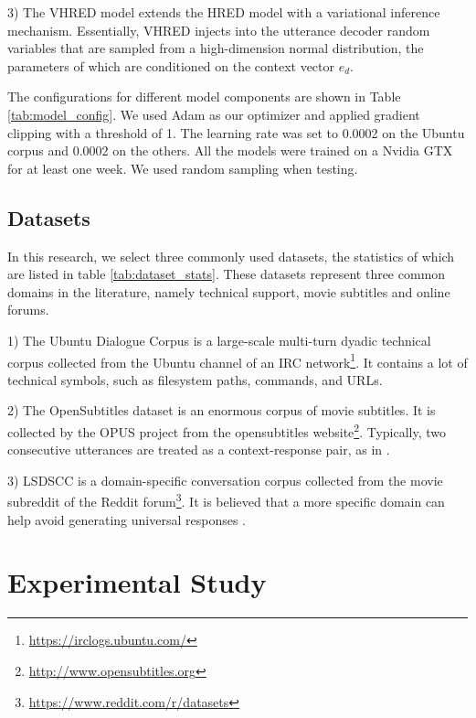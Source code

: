 \documentclass[runningheads]{llncs}
\begin{document}
3) The VHRED model \cite{VHRED} extends the HRED model with a variational inference mechanism. Essentially, VHRED injects into the utterance decoder random variables that are sampled from a high-dimension normal distribution, the parameters of which are conditioned on the context vector $e_d$. 

    The configurations for different model components are shown in Table \ref{tab:model_config}. We used Adam \cite{AdamOpt} as our optimizer and applied gradient clipping with a threshold of 1. The learning rate was set to 0.0002 on the Ubuntu corpus and 0.0002 on the others. All the models were trained on a Nvidia GTX for at least one week. We used random sampling when testing.
    

\subsection{Datasets}
In this research, we select three commonly used datasets, the statistics of which are listed in table \ref{tab:dataset_stats}. These datasets represent three common domains in the literature, namely technical support, movie subtitles and online forums.
    

1) The Ubuntu Dialogue Corpus \cite{ubuntu_corpus} is a large-scale multi-turn dyadic technical corpus collected from the Ubuntu channel of an IRC network\footnote{\url{https://irclogs.ubuntu.com/}}. It contains a lot of technical symbols, such as filesystem paths, commands, and URLs.

2) The OpenSubtitles dataset \cite{opensub} is an enormous corpus of movie subtitles. It is collected by the OPUS project \cite{OPUS} from the opensubtitles website\footnote{\url{http://www.opensubtitles.org}}. Typically, two consecutive utterances are treated as a context-response pair, as in \cite{GoogleChatbot,MMI}.

3) LSDSCC \cite{LSDSCC} is a domain-specific conversation corpus collected from the movie subreddit of the Reddit forum\footnote{\url{https://www.reddit.com/r/datasets}}. It is believed that a more specific domain can help avoid generating universal responses \cite{LSDSCC}.

\section{Experimental Study}
\end{document}
